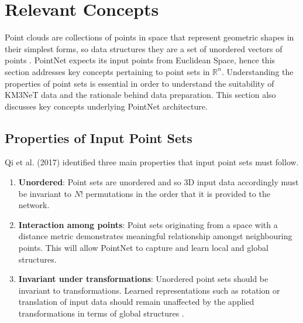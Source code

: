 \chapter{Relevant Concepts}
\label{sec:concepts}
\ifpdf
    \graphicspath{{3_concepts/figures/PNG/}{3_concepts/figures/PDF/}{3_concepts/figures/}}
\else
    \graphicspath{{3_concepts/figures/EPS/}{3_concepts/figures/}}
\fi


Point clouds are collections of points in space that represent geometric shapes in their simplest forms, so data structures they are a set of unordered vectors of points \cite{10.1145/3326362}. PointNet expects its input points from Euclidean Space, hence this section addresses key concepts pertaining to point sets in $\mathbb{R}^n$. Understanding the properties of point sets is essential in order to understand the suitability of KM3NeT data and the rationale behind data preparation. This section also discusses key concepts underlying PointNet architecture. 

\section{Properties of Input Point Sets}
\label{sec:concepts-pointset}
Qi et al. (2017) identified three main properties that input point sets must follow.  
 
\begin{enumerate}
    \item \textbf{Unordered}: Point sets are unordered and so 3D input data accordingly must be invariant to $N!$ permutations in the order that it is provided to the network.
    \item \textbf{Interaction among points}: Point sets originating from a space with a distance metric demonstrates meaningful relationship amongst neighbouring points. This will allow PointNet to capture and learn local and global structures.
    \item \textbf{Invariant under transformations}: Unordered point sets should be invariant to transformations. Learned representations such as rotation or translation of input data should remain unaffected by the applied transformations in terms of global structures \cite{qi2017pointnet}. 
\end{enumerate}


